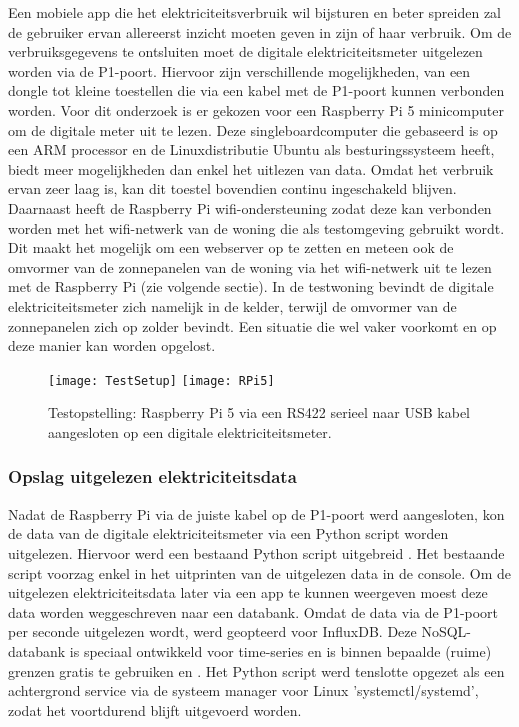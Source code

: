 Een mobiele app die het elektriciteitsverbruik wil bijsturen en beter spreiden zal de gebruiker ervan allereerst inzicht moeten geven in zijn of haar verbruik. Om de verbruiksgegevens te ontsluiten moet de digitale elektriciteitsmeter uitgelezen worden via de P1-poort. Hiervoor zijn verschillende mogelijkheden, van een dongle tot kleine toestellen die via een kabel met de P1-poort kunnen verbonden worden. Voor dit onderzoek is er gekozen voor een Raspberry Pi 5 minicomputer om de digitale meter uit te lezen. Deze singleboardcomputer die gebaseerd is op een ARM processor en de Linuxdistributie Ubuntu als besturingssysteem heeft, biedt meer mogelijkheden dan enkel het uitlezen van data. Omdat het verbruik ervan zeer laag is, kan dit toestel bovendien continu ingeschakeld blijven. Daarnaast heeft de Raspberry Pi wifi-ondersteuning zodat deze kan verbonden worden met het wifi-netwerk van de woning die als testomgeving gebruikt wordt. Dit maakt het mogelijk om een webserver op te zetten en meteen ook de omvormer van de zonnepanelen van de woning via het wifi-netwerk uit te lezen met de Raspberry Pi (zie volgende sectie). In de testwoning bevindt de digitale elektriciteitsmeter zich namelijk in de kelder, terwijl de omvormer van de zonnepanelen zich op zolder bevindt. Een situatie die wel vaker voorkomt en op deze manier kan worden opgelost.

\begin{figure}[h!]
    \centering
    \texttt{[image: TestSetup]} \hspace{0.7cm}
    \texttt{[image: RPi5]}
    \caption{Testopstelling: Raspberry Pi 5 via een RS422 serieel naar USB kabel aangesloten op een digitale elektriciteitsmeter.}
\end{figure}

\subsubsection{Opslag uitgelezen elektriciteitsdata}

Nadat de Raspberry Pi via de juiste kabel op de P1-poort werd aangesloten, kon de data van de digitale elektriciteitsmeter via een Python script worden uitgelezen. Hiervoor werd een bestaand Python script uitgebreid \autocite{Depuydt2021}. Het bestaande script voorzag enkel in het uitprinten van de uitgelezen data in de console. Om de uitgelezen elektriciteitsdata later via een app te kunnen weergeven moest deze data worden weggeschreven naar een databank. Omdat de data via de P1-poort per seconde uitgelezen wordt, werd geopteerd voor InfluxDB. Deze NoSQL-databank is speciaal ontwikkeld voor time-series en is binnen bepaalde (ruime) grenzen gratis te gebruiken \autocite{Balis2017} en  \autocite{Struckov2019}. Het Python script werd tenslotte opgezet als een achtergrond service via de systeem manager voor Linux 'systemctl/systemd', zodat het voortdurend blijft uitgevoerd worden.

